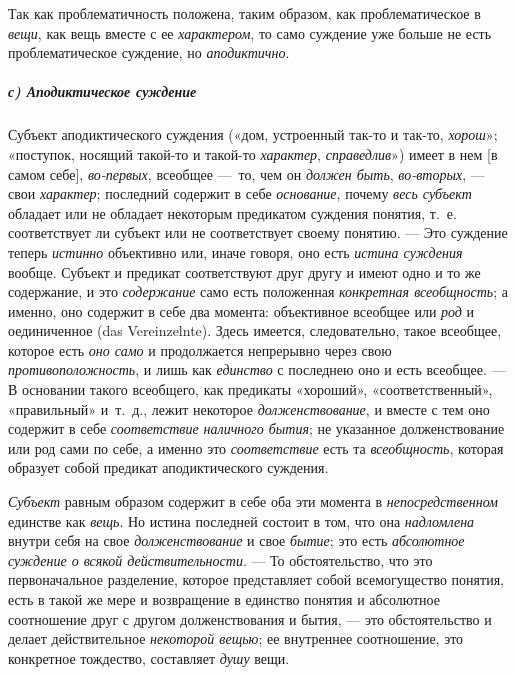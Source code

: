 \documentclass[twoside]{article}
\begin{document}
{{{\label{bkm:bm66b}Так как проблематичность положена, таким
образом, как проблематическое в
{\em вещи}, как вещь
вместе с ее {\em характером},
то само суждение уже больше не есть проблематическое
суждение, но {\em аподиктично}.

\subparagraph[с) Аподиктическое суждение]{с) Аподиктическое суждение}
Субъект аподиктического суждения («дом, устроенный так-то и
так-то, {\em хорош}»;
«поступок, носящий такой-то и такой-то
{\em характер},
{\em справедлив}») имеет в
нем [в самом себе], {\em во-первых},
всеобщее —~то, чем он
{\em должен быть},
{\em во-вторых}, — свои
{\em характер}; последний
содержит в себе {\em основание},
почему {\em весь субъект}
обладает или не обладает некоторым предикатом суждения
понятия, т.~е. соответствует ли субъект или не соответствует своему
понятию. — Это суждение теперь
{\em истинно} объективно
или, иначе говоря, оно есть {\em истина
суждения} вообще. Субъект и предикат соответствуют друг
другу и имеют одно и то же содержание, и это
{\em содержание} само
есть положенная {\em конкретная
всеобщность}; а именно, оно содержит в себе два момента:
объективное всеобщее или {\em род}
и оединиченное (das Vereinzelnte). Здесь
имеется, следовательно, такое всеобщее, которое есть
{\em оно само} и
продолжается непрерывно через свою
{\em противоположность},
и лишь как {\em единство}
с последнею оно и есть всеобщее. — В основании
такого всеобщего, как предикаты «хороший», «соответственный», «правильный»
и~т.~д., лежит некоторое
{\em долженствование}, и
вместе с тем оно содержит в себе
{\em соответствие наличного бытия};
не указанное долженствование или род сами по себе, а именно
это {\em соответствие}
есть та
{\em всеобщность},
которая образует собой предикат аподиктического суждения.

{\em Субъект} равным
образом содержит в себе оба эти момента в
{\em непосредственном}
единстве как {\em вещь}.
Но истина последней состоит в том, что она
{\em надломлена} внутри
себя на свое {\em долженствование}
и свое {\em бытие};
это есть {\em абсолютное
суждение о всякой действительности}. — То обстоятельство,
что это первоначальное разделение, которое представляет собой всемогущество
понятия, есть в такой же мере и возвращение в единство понятия и абсолютное
соотношение друг с другом долженствования и бытия, — это
обстоятельство и делает действительное
{\em некоторой вещью}; ее
внутреннее соотношение, это конкретное тождество, составляет
{\em душу} вещи.

}}}
\end{document}
